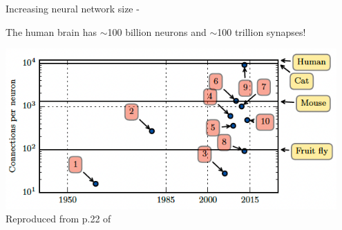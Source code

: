 %
%
%

\begin{frame}[t,allowframebreaks]{Increasing neural network size - }



    The human brain has $\sim$100 billion neurons and $\sim$100 trillion synapses!

    \begin{center}
        \includegraphics[width=0.95\textwidth]
          {./images/dl_intro/nnet_size_connections_vs_time_01.png}\\
        {\scriptsize \color{col:attribution} 
        Reproduced from p.22 of \cite{Goodfellow:2017DL}}\\
    \end{center}

    \framebreak



\end{frame}
